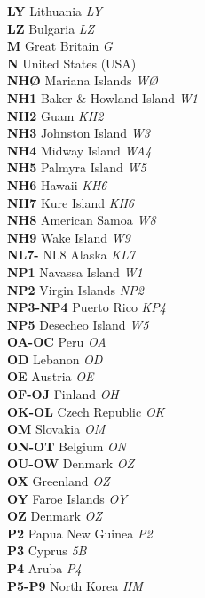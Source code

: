 \documentclass[landscape,a4paper]{article}
\begin{document}
\begin{multicols}{7}
\textbf{LY} Lithuania \emph{LY} \\
\textbf{LZ} Bulgaria \emph{LZ} \\
\textbf{M} Great Britain \emph{G} \\
\textbf{N} United States (USA) \\
\textbf{NHØ} Mariana Islands \emph{WØ} \\
\textbf{NH1} Baker \& Howland Island \emph{W1} \\
\textbf{NH2} Guam \emph{KH2} \\
\textbf{NH3} Johnston Island \emph{W3} \\
\textbf{NH4} Midway Island \emph{WA4} \\
\textbf{NH5} Palmyra Island \emph{W5} \\
\textbf{NH6} Hawaii \emph{KH6} \\
\textbf{NH7} Kure Island \emph{KH6} \\
\textbf{NH8} American Samoa \emph{W8} \\
\textbf{NH9} Wake Island \emph{W9} \\
\textbf{NL7-} NL8 Alaska \emph{KL7} \\
\textbf{NP1} Navassa Island \emph{W1} \\
\textbf{NP2} Virgin Islands \emph{NP2} \\
\textbf{NP3-NP4} Puerto Rico \emph{KP4} \\
\textbf{NP5} Desecheo Island \emph{W5} \\
\textbf{OA-OC} Peru \emph{OA} \\
\textbf{OD} Lebanon \emph{OD} \\
\textbf{OE} Austria \emph{OE} \\
\textbf{OF-OJ} Finland \emph{OH} \\
\textbf{OK-OL} Czech Republic \emph{OK} \\
\textbf{OM} Slovakia \emph{OM} \\
\textbf{ON-OT} Belgium \emph{ON} \\
\textbf{OU-OW} Denmark \emph{OZ} \\
\textbf{OX} Greenland \emph{OZ} \\
\textbf{OY} Faroe Islands \emph{OY} \\
\textbf{OZ} Denmark \emph{OZ} \\
\textbf{P2} Papua New Guinea \emph{P2} \\
\textbf{P3} Cyprus \emph{5B} \\
\textbf{P4} Aruba \emph{P4} \\
\textbf{P5-P9} North Korea \emph{HM} \\

\end{multicols}
\end{document}
